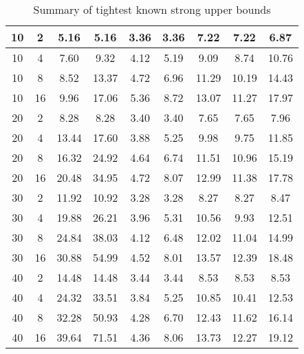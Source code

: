 \begin{table}[b]
  \caption{Summary of tightest known strong upper bounds}
\label{tab:summaryofbounds}
\centering
\footnotesize
\begin{tabular}{|c|c|c|c|c|c|c|c|c|}
\hline
10 & 2 & 5.16 & 5.16 & 3.36 & 3.36 & 7.22 & 7.22 & 6.87\\ \hline 
10 & 4 & 7.60 & 9.32 & 4.12 & 5.19 & 9.09 & 8.74 & 10.76\\ \hline 
10 & 8 & 8.52 & 13.37 & 4.72 & 6.96 & 11.29 & 10.19 & 14.43\\ \hline 
10 & 16 & 9.96 & 17.06 & 5.36 & 8.72 & 13.07 & 11.27 & 17.97\\ \hline 
20 & 2 & 8.28 & 8.28 & 3.40 & 3.40 & 7.65 & 7.65 & 7.96\\ \hline 
20 & 4 & 13.44 & 17.60 & 3.88 & 5.25 & 9.98 & 9.75 & 11.85\\ \hline 
20 & 8 & 16.32 & 24.92 & 4.64 & 6.74 & 11.51 & 10.96 & 15.19\\ \hline 
20 & 16 & 20.48 & 34.95 & 4.72 & 8.07 & 12.99 & 11.38 & 17.78\\ \hline 
30 & 2 & 11.92 & 10.92 & 3.28 & 3.28 & 8.27 & 8.27 & 8.47\\ \hline 
30 & 4 & 19.88 & 26.21 & 3.96 & 5.31 & 10.56 & 9.93 & 12.51\\ \hline 
30 & 8 & 24.84 & 38.03 & 4.12 & 6.48 & 12.02 & 11.04 & 14.99\\ \hline 
30 & 16 & 30.88 & 54.99 & 4.52 & 8.01 & 13.57 & 12.39 & 18.48\\ \hline 
40 & 2 & 14.48 & 14.48 & 3.44 & 3.44 & 8.53 & 8.53 & 8.53\\ \hline 
40 & 4 & 24.32 & 33.51 & 3.84 & 5.25 & 10.85 & 10.41 & 12.53\\ \hline 
40 & 8 & 32.28 & 50.93 & 4.28 & 6.70 & 12.43 & 11.62 & 16.14\\ \hline 
40 & 16 & 39.64 & 71.51 & 4.36 & 8.06 & 13.73 & 12.27 & 19.12\\ \hline 
\end{tabular}
\end{table}
\normalsize
